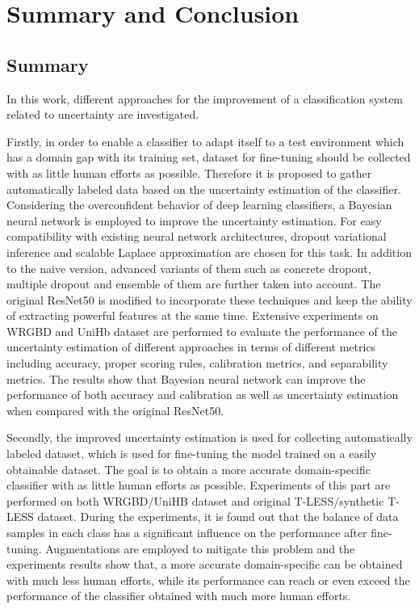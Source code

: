 \chapter{Summary and Conclusion}
\section{Summary}
In this work, different approaches for the improvement of a classification system related to uncertainty are investigated.

Firstly, in order to enable a classifier to adapt itself to a test environment which has a domain gap with its training set, dataset for fine-tuning should be collected with as little human efforts as possible.
Therefore it is proposed to gather automatically labeled data based on the uncertainty estimation of the classifier.
Considering the overconfident behavior of deep learning classifiers, a Bayesian neural network is employed to improve the uncertainty estimation.
For easy compatibility with existing neural network architectures, dropout variational inference and scalable Laplace approximation are chosen for this task.
In addition to the naive version, advanced variants of them such as concrete dropout, multiple dropout and ensemble of them are further taken into account.
The original ResNet50 is modified to incorporate these techniques and keep the ability of extracting powerful features at the same time.
Extensive experiments on WRGBD and UniHb dataset are performed to evaluate the performance of the uncertainty estimation of different approaches in terms of different metrics including accuracy, proper scoring rules, calibration metrics, and separability metrics.
The results show that Bayesian neural network can improve the performance of both accuracy and calibration as well as uncertainty estimation when compared with the original ResNet50. 

Secondly, the improved uncertainty estimation is used for collecting automatically labeled dataset, which is used for fine-tuning the model trained on a easily obtainable dataset.
The goal is to obtain a more accurate domain-specific classifier with as little human efforts as possible.
Experiments of this part are performed on both WRGBD/UniHB dataset and original T-LESS/synthetic T-LESS dataset.
During the experiments, it is found out that the balance of data samples in each class has a significant influence on the performance after fine-tuning.
Augmentations are employed to mitigate this problem and the experiments results show that, a more accurate domain-specific can be obtained with much less human efforts, while its performance can reach or even exceed the performance of the classifier obtained with much more human efforts.

